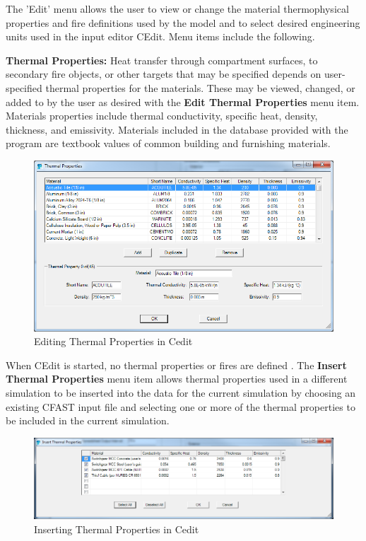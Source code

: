 The 'Edit' menu allows the user to view or change the material thermophysical properties and fire definitions used by the model and to select desired engineering units used in the input editor CEdit. Menu items include the following.

\textbf{Thermal Properties:} Heat transfer through compartment surfaces, to secondary fire objects, or other targets that may be specified depends on user-specified thermal properties for the materials.  These may be viewed, changed, or added to by the user as desired with the \textbf{Edit Thermal Properties} menu item. Materials properties include thermal conductivity, specific heat, density, thickness, and emissivity. Materials included in the database provided with the program are textbook values of common building and furnishing materials.

\begin{figure}[h!]
\begin{center}
\includegraphics[width=6.5in]{FIGURES/Running_CFAST/Thermal_Properties_Edit}
Editing Thermal Properties in Cedit
\end{center}
\end{figure}

When CEdit is started, no thermal properties or fires are defined \label{Thermal_Properties_Menu}.  The \textbf{Insert Thermal Properties} menu item allows thermal properties used in a different simulation to be inserted into the data for the current simulation by choosing an existing CFAST input file and selecting one or more of the thermal properties to be included in the current simulation.

\begin{figure}[h!]
\begin{center}
\includegraphics[width=6.5in]{FIGURES/Running_CFAST/Thermal_Properties_Insert}
Inserting Thermal Properties in Cedit
\end{center}
\end{figure}

